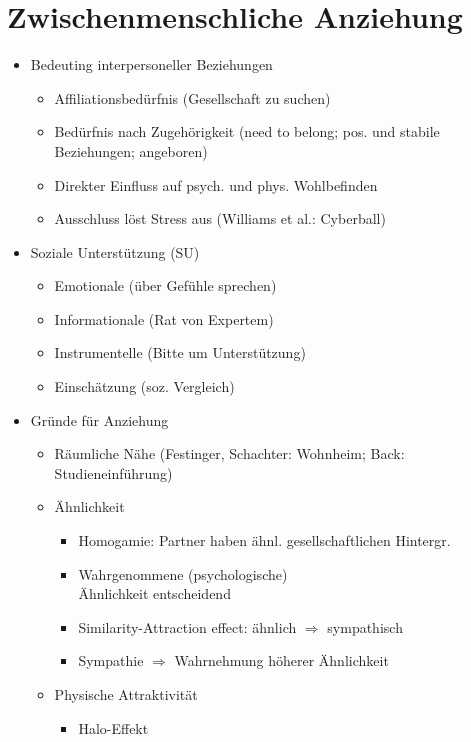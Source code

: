\documentclass[11pt, paper=a4, twocolumn]{scrartcl}
\begin{document}
	\section{Zwischenmenschliche Anziehung}
		\begin{itemize}
			\item Bedeuting interpersoneller Beziehungen
				\begin{itemize}
					\item Affiliationsbedürfnis (Gesellschaft zu suchen)
					\item Bedürfnis nach Zugehörigkeit (need to belong; pos. und stabile Beziehungen; angeboren)
					\item Direkter Einfluss auf psych. und phys. Wohlbefinden
					\item Ausschluss löst Stress aus (Williams et al.: Cyberball)
				\end{itemize}
			\item Soziale Unterstützung (SU)
				\begin{itemize}
					\item Emotionale (über Gefühle sprechen)
					\item Informationale (Rat von Expertem)
					\item Instrumentelle (Bitte um Unterstützung)
					\item Einschätzung (soz. Vergleich)
				\end{itemize}
			\item Gründe für Anziehung
				\begin{itemize}
					\item Räumliche Nähe (Festinger, Schachter: Wohnheim; Back: Studieneinführung)
					\item Ähnlichkeit
						\begin{itemize}
							\item Homogamie: Partner haben ähnl. gesellschaftlichen Hintergr.
							\item Wahrgenommene (psychologische) \\Ähnlichkeit entscheidend
							\item Similarity-Attraction effect: ähnlich $\Rightarrow$ sympathisch
							\item Sympathie $\Rightarrow$ Wahrnehmung höherer Ähnlichkeit
						\end{itemize}
					\item Physische Attraktivität
						\begin{itemize}
							\item Halo-Effekt
								\begin{itemize}

\end{itemize}
\end{itemize}
\end{itemize}
\end{itemize}
\end{document}
